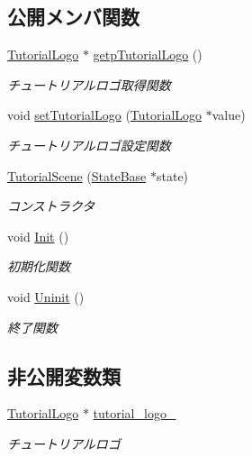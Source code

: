 \subsection*{公開メンバ関数}
\begin{DoxyCompactItemize}
\item 
\mbox{\hyperlink{class_tutorial_logo}{Tutorial\+Logo}} $\ast$ \mbox{\hyperlink{class_tutorial_scene_a9f1a224f8864ccd5ddfe5a8c894a4582}{getp\+Tutorial\+Logo}} ()
\begin{DoxyCompactList}\small\item\em チュートリアルロゴ取得関数 \end{DoxyCompactList}\item 
void \mbox{\hyperlink{class_tutorial_scene_a7c8b448ac848d4811e448acf45c5a48e}{set\+Tutorial\+Logo}} (\mbox{\hyperlink{class_tutorial_logo}{Tutorial\+Logo}} $\ast$value)
\begin{DoxyCompactList}\small\item\em チュートリアルロゴ設定関数 \end{DoxyCompactList}\item 
\mbox{\hyperlink{class_tutorial_scene_a90f8c010bd72aa3dae61a5294fdfbeb7}{Tutorial\+Scene}} (\mbox{\hyperlink{class_scene_base_1_1_state_base}{State\+Base}} $\ast$state)
\begin{DoxyCompactList}\small\item\em コンストラクタ \end{DoxyCompactList}\item 
void \mbox{\hyperlink{class_tutorial_scene_a73023dcc6009590adb942c04631f3294}{Init}} ()
\begin{DoxyCompactList}\small\item\em 初期化関数 \end{DoxyCompactList}\item 
void \mbox{\hyperlink{class_tutorial_scene_a988a579b179fc989876b28e24fae7591}{Uninit}} ()
\begin{DoxyCompactList}\small\item\em 終了関数 \end{DoxyCompactList}\end{DoxyCompactItemize}
\subsection*{非公開変数類}
\begin{DoxyCompactItemize}
\item 
\mbox{\hyperlink{class_tutorial_logo}{Tutorial\+Logo}} $\ast$ \mbox{\hyperlink{class_tutorial_scene_a3c2e0e47c2e6078bb7eff928d72fde2a}{tutorial\+\_\+logo\+\_\+}}
\begin{DoxyCompactList}\small\item\em チュートリアルロゴ \end{DoxyCompactList}\end{DoxyCompactItemize}
